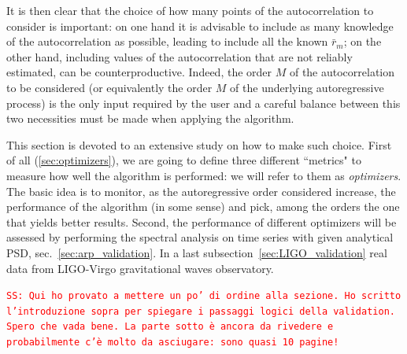 \documentclass[twocolumn,showpacs,preprintnumbers,nofootinbib,prd,
superscriptaddress,10pt]{revtex4-1}
\newcommand{\sschmidt}[1]{{\textcolor{red}{\texttt{SS: #1}} }}
\begin{document}

It is then clear that the choice of how many points of the autocorrelation to consider is important: on one hand it is advisable to include as many knowledge of the autocorrelation as possible, leading to include all the known $\bar{r}_m$; on the other hand, including values of the autocorrelation that are not reliably estimated, can be counterproductive.
Indeed, the order $M$ of the autocorrelation to be considered (or equivalently the order $M$ of the underlying autoregressive process) is the only input required by the user and a careful balance between this two necessities must be made when applying the algorithm.

This section is devoted to an extensive study on how to make such choice.
First of all (\ref{sec:optimizers}), we are going to define three different ``metrics" to measure how well the algorithm is performed: we will refer to them as \textit{optimizers}. The basic idea is to monitor, as the autoregressive order considered increase, the performance of the algorithm (in some sense) and pick, among the orders the one that yields better results.
Second, the performance of different optimizers will be assessed by performing the spectral analysis on time series with given analytical PSD, sec.~\ref{sec:arp_validation}.
In a last subsection~\ref{sec:LIGO_validation} real data from LIGO-Virgo gravitational waves observatory.

\sschmidt{Qui ho provato a mettere un po' di ordine alla sezione. Ho scritto l'introduzione sopra per spiegare i passaggi logici della validation. Spero che vada bene. La parte sotto è ancora da rivedere e probabilmente c'è molto da asciugare: sono quasi 10 pagine!}
\end{document}

